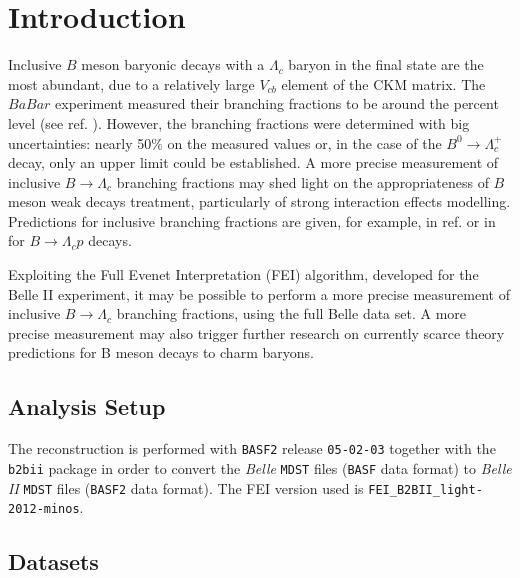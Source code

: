 
\section{Introduction}
\label{sec:introduction}

 
 Inclusive $B$ meson baryonic decays with a $\Lambda_c$ baryon in the final state are the most abundant, due to a relatively large $V_{cb}$ element of the CKM matrix. The $BaBar$ experiment measured their branching fractions to be around the percent level (see ref. \cite{PhysRevD.75.072002}). 
However, the branching fractions were determined with big uncertainties: nearly 50$\%$ on the measured values or, in the case of the  $B^0 \rightarrow \Lambda_c^+$ decay, only an upper limit could be established. 
A more precise measurement of inclusive $B \rightarrow \Lambda_c$ branching fractions may shed light on the appropriateness of  $B$ meson weak decays treatment, particularly of strong
interaction effects modelling. Predictions for inclusive branching fractions are given, for example,
in ref. \cite{grach1997exclusive} or in \cite{Hsiao_2020}  for $B \rightarrow \Lambda_c p$ decays.

Exploiting the Full Evenet Interpretation (FEI) algorithm, developed for the Belle II experiment, it may be possible to perform a more precise measurement of inclusive $B \rightarrow \Lambda_c$ branching fractions, using the full Belle data set. A more precise measurement may also trigger further research on currently scarce theory predictions for B meson decays to charm baryons.

\subsection{Analysis Setup}

The reconstruction is performed with \texttt{BASF2} release \texttt{05-02-03} together with the 
\texttt{b2bii} package in order to convert the \textit{Belle} \texttt{MDST} files (\texttt{BASF} 
data format) to \textit{Belle II} \texttt{MDST} files (\texttt{BASF2} data format). 
The FEI version used is \texttt{FEI\_}\texttt{B2BII\_}\texttt{light-2012-minos}.

\subsection{Datasets}

